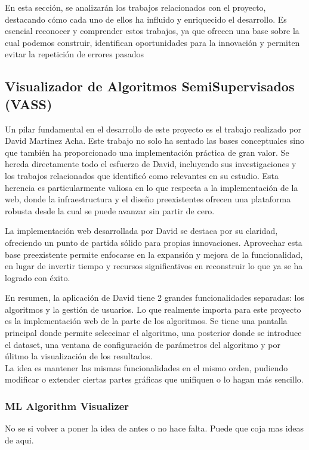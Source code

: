 En esta sección, se analizarán los trabajos relacionados con el proyecto, destacando cómo cada uno de ellos ha influido y enriquecido el desarrollo. Es esencial reconocer y comprender estos trabajos, ya que ofrecen una base sobre la cual podemos construir, identifican oportunidades para la innovación y permiten evitar la repetición de errores pasados
\subsection{Visualizador de Algoritmos SemiSupervisados (VASS)}
Un pilar fundamental en el desarrollo de este proyecto es el trabajo realizado por David Martinez Acha. Este trabajo no solo ha sentado las bases conceptuales sino que también ha proporcionado una implementación práctica de gran valor. Se hereda directamente todo el esfuerzo de David, incluyendo sus investigaciones y los trabajos relacionados que identificó como relevantes en su estudio. Esta herencia es particularmente valiosa en lo que respecta a la implementación de la web, donde la infraestructura y el diseño preexistentes ofrecen una plataforma robusta desde la cual se puede avanzar sin partir de cero.

La implementación web desarrollada por David se destaca por su claridad, ofreciendo un punto de partida sólido para propias innovaciones. Aprovechar esta base preexistente permite enfocarse en la expansión y mejora de la funcionalidad, en lugar de invertir tiempo y recursos significativos en reconstruir lo que ya se ha logrado con éxito.

En resumen, la aplicación de David tiene 2 grandes funcionalidades separadas: los algoritmos y la gestión de usuarios. Lo que realmente importa para este proyecto es la implementación web de la parte de los algoritmos. Se tiene una pantalla principal donde permite seleccinar el algoritmo, una posterior donde se introduce el dataset, una ventana de configuración de parámetros del algoritmo y por úlitmo la visualización de los resultados.\\
La idea es mantener las mismas funcionalidades en el mismo orden, pudiendo modificar o extender ciertas partes gráficas que unifiquen o lo hagan más sencillo.

\subsubsection{ML Algorithm Visualizer}
No se si volver a poner la idea de antes o no hace falta. Puede que coja mas ideas de aqui.